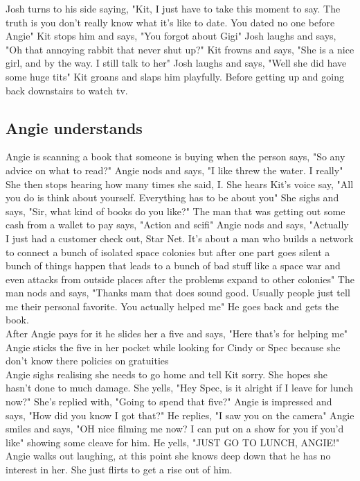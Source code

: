 \documentclass{article}[12px] %
\begin{document}
Josh turns to his side saying, "Kit, I just have to take this moment to say. The truth is you don't really know what it's like to date. You dated no one before Angie" Kit stops him and says, "You forgot about Gigi" Josh laughs and says, "Oh that annoying rabbit that never shut up?" Kit frowns and says, "She is a nice girl, and by the way. I still talk to her" Josh laughs and says, "Well she did have some huge tits" Kit groans and slaps him playfully. Before getting up and going back downstairs to watch tv.\\

\subsection* {Angie understands}
Angie is scanning a book that someone is buying when the person says, "So any advice on what to read?" Angie nods and says, "I like threw the water. I really" She then stops hearing how many times she said, I. She hears Kit's voice say, "All you do is think about yourself. Everything has to be about you" She sighs and says, "Sir, what kind of books do you like?" The man that was  getting out some cash from a wallet to pay says, "Action and scifi" Angie nods and says, "Actually I just had a customer check out, Star Net. It's about a man who builds a network to connect a bunch of isolated space colonies but after one part goes silent a bunch of things happen that leads to a bunch of bad stuff like a space war and even attacks from outside places after the problems expand to other colonies" The man nods and says, "Thanks mam that does sound good. Usually people just tell me their personal favorite. You actually helped me" He goes back and gets the book. \\

After Angie pays for it he slides her a five and says, "Here that's for helping me" Angie sticks the five in her pocket while looking for Cindy or Spec because she don't know there policies on gratuities \\

Angie sighs realising she needs to go home and tell Kit sorry. She hopes she hasn't done to much damage. She yells, "Hey Spec, is it alright if I leave for lunch now?" She's replied with, "Going to spend that five?" Angie is impressed and says, "How did you know I got that?" He replies, "I saw you on the camera" Angie smiles and says, "OH nice filming me now? I can put on a show for you if you'd like" showing some cleave for him. He yells, "JUST GO TO LUNCH, ANGIE!" Angie walks out laughing, at this point she knows deep down that he has no interest in her. She just flirts to get a rise out of him.\\
\end{document}

